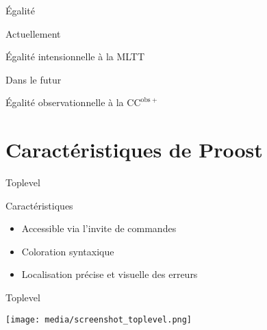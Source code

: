 \documentclass[12pt, aspectratio=169]{beamer}
\begin{document}
        \begin{frame}{Égalité}
            
            \begin{block}{Actuellement}
                
                Égalité intensionnelle à la MLTT

            \end{block} \pause

            \begin{alertblock}{Dans le futur}
                
                Égalité observationnelle à la $\mathrm{CC}^{\mathrm{obs}+}$

            \end{alertblock}

        \end{frame}

    \section{Caractéristiques de Proost}

        \begin{frame}{Toplevel}
            
            \begin{block}{Caractéristiques}
                
                \begin{itemize}
                    \item Accessible via l'invite de commandes
                    \item Coloration syntaxique
                    \item Localisation précise et visuelle des erreurs
                \end{itemize}

            \end{block} \pause

            \begin{block}{Toplevel}
                
                \begin{center}
                    \texttt{[image: media/screenshot\_toplevel.png]}
                \end{center}

            \end{block}

        \end{frame}
\end{document}
